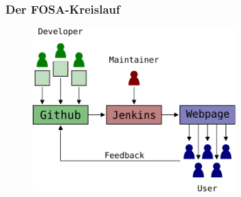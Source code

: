 \begin{frame}
	\frametitle{Der FOSA-Kreislauf}
	\begin{figure}
		\centering
		\includegraphics[width=0.7\textwidth]{fig/fosa-loop.pdf}

	\end{figure}
\end{frame}

